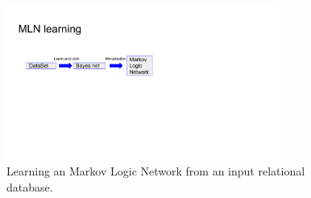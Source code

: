  	 
 	  	\begin{figure}[t]
 	  		\centering
 	  		\includegraphics[width=0.8\textwidth] 
 	  		{figures/MLNLearningProcess.pdf}
 	  		\caption{Learning an Markov Logic Network from an input relational database.
 	  			\label{MLNLearningProcess}
 	  		}
 	  	\end{figure}
 	 
 	
 	
